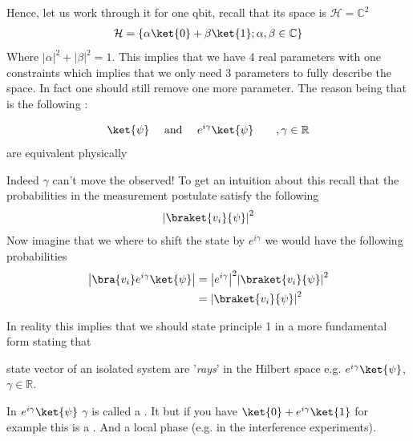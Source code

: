 Hence, let us work through it for one qbit, recall that its space is $\mathcal{H} = \mathbb{C}^2$ 
\begin{align*} 
	\mathcal{H} =  \left\{\alpha \ket{0} + \beta \ket{1}; \alpha, \beta \in \mathbb{C}\right\}
\end{align*}
Where $\left|\alpha\right|^2 + \left|\beta\right|^2 = 1$. This implies that we have 4 real parameters with one constraints which implies that we only need 3 parameters to fully describe the space. In fact one should still remove one more parameter. The reason being that is the following :
\begin{center}
	\begin{align*} 
		\ket{\psi}\mathspace \text{ and } \mathspace e^{i \gamma}\ket{\psi}  \mathspace \mathspace, \gamma \in \mathbb{R}
	\end{align*}
	are equivalent physically
\end{center}
Indeed $\gamma$ can't move the observed! To get an intuition about this recall that the probabilities in the measurement postulate satisfy the following 
\begin{align*} 
	\left|\braket{v_i}{\psi}\right|^2
\end{align*}
Now imagine that we where to shift the state by $e^{i \gamma}$ we would have the following probabilities 
\begin{align*} 
	\left|\bra{v_i}e^{i \gamma}\ket{\psi}\right| &= \left|e^{i \gamma}\right|^2 \left|\braket{v_i}{\psi}\right|^2\\
													   &= \left|\braket{v_i}{\psi}\right|^2
\end{align*}

In reality this implies that we should state principle 1 in a more fundamental form stating that 
\begin{center}
    state vector of an isolated system are '\textit{rays}' in the Hilbert space e.g. $e^{i \gamma}\ket{\psi}$, $\gamma \in \mathbb{R}$.
\end{center}
\begin{framedremark}
In $e^{ i \gamma}\ket{\psi}$ $\gamma$ is called a . It  but if you have $\ket{0} + e^{i \gamma}\ket{1}$ for example this is a . And a local phase  (e.g. in the interference experiments).
\end{framedremark}

